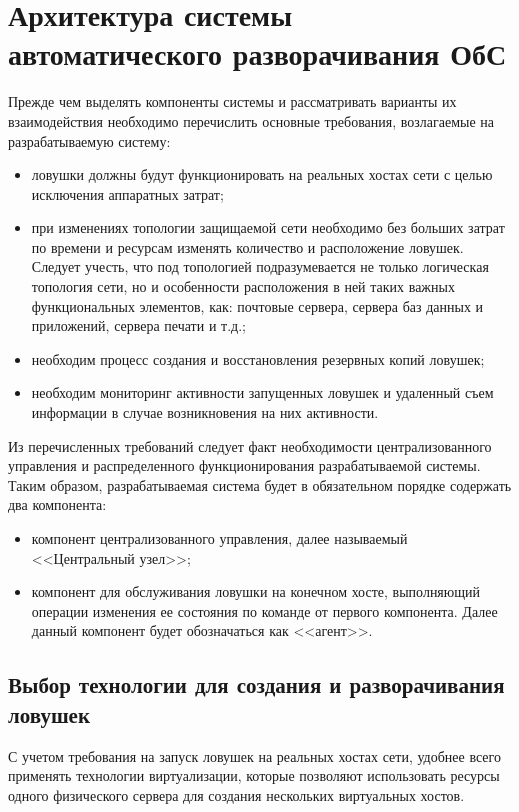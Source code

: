 \section{Архитектура системы автоматического разворачивания ОбС}

Прежде чем выделять компоненты системы и рассматривать варианты их взаимодействия необходимо перечислить основные требования, возлагаемые на разрабатываемую систему:
\begin{itemize}
\item ловушки должны будут функционировать на реальных хостах сети с целью исключения аппаратных затрат;
\item при изменениях топологии защищаемой сети необходимо без больших затрат по времени и ресурсам изменять количество и расположение ловушек. Следует учесть, что под топологией подразумевается не только логическая топология сети, но и особенности расположения в ней таких важных функциональных элементов, как: почтовые сервера, сервера баз данных и приложений, сервера печати и т.д.;
\item необходим процесс создания и восстановления резервных копий ловушек;
\item необходим мониторинг активности запущенных ловушек и удаленный съем информации в случае возникновения на них активности.
\end{itemize}

Из перечисленных требований следует факт необходимости централизованного управления и распределенного функционирования разрабатываемой системы. Таким образом, разрабатываемая система будет в обязательном порядке содержать два компонента:
\begin{itemize}
	\item компонент централизованного управления, далее называемый <<Центральный узел>>;
	\item компонент для обслуживания ловушки на конечном хосте, выполняющий операции изменения ее состояния по команде от первого компонента. Далее данный компонент будет обозначаться как <<агент>>.
\end{itemize}


\subsection{Выбор технологии для создания и разворачивания ловушек}

С учетом требования на запуск ловушек на реальных хостах сети, удобнее всего применять технологии виртуализации, которые позволяют использовать ресурсы одного физического сервера для создания нескольких виртуальных хостов.

